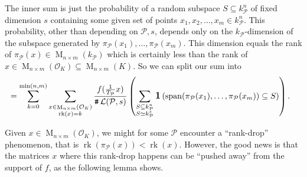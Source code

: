 \documentclass{amsart}
\newcommand{\vlad}{\color{brown}}
\theoremstyle{definition}
\theoremstyle{remark}
\DeclareMathOperator{\M}{M}
\DeclareMathOperator{\card}{\texttt{\#}}
\DeclareMathOperator{\rank}{rk}
\DeclareMathOperator{\spant}{span}
\DeclareMathOperator{\ind}{\mathlarger{\mathbf{1}}}
\DeclareMathOperator{\N}{N}
\begin{document}
The inner sum is just the probability of a random subspace $S \subseteq k_\mathcal{P}^{n}$ of fixed dimension $s$ containing some given set of points $x_1,x_2,\dots,x_m \in k_\mathcal{P}^{n}$. This probability, other than depending on $\mathcal{P},s$, depends only on the $k_\mathcal{P}$-dimension of the subspace generated by $\pi_\mathcal{P}(x_1),\dots,\pi_\mathcal{P}(x_m)$. 
This dimension equals the rank of $\pi_\mathcal{P}(x) \in \M_{ n \times m }(k_\mathcal{P})$ 
which is certainly less than the rank of 
$x\in \M_{n \times m}(\mathcal{O}_K) \subseteq \M_{n \times m }(K)$. So we can split our sum into 
\begin{align}
& = 
\sum_{k=0}^{\min(n,m)}\sum_{\substack{x \in \M_{n \times m }(\mathcal{O}_K) \\ \rank(x) = k}}
\frac{  f( \tfrac{1}{T_{\mathcal{P}}} x)}{\card \mathcal{L}(\mathcal{P},s)} 
\left(
    \sum_{\substack{  S \subseteq k_\mathcal{P}^{n} \\  S \simeq k_{\mathcal{P}}^{s} } } 
    \ind\left(
        \spant
        ( \pi_{\mathcal{P}}(x_1),\dots,\pi_{\mathcal{P}}(x_m)) \subseteq S
\right) \right). 
\label{eq:not_even_the_final_form}
\end{align}

Given $x \in \M_{n \times m }(\mathcal{O}_K)$, we might for some $\mathcal{P}$ encounter a ``rank-drop'' phenomenon, that is $\rank\left(\pi_\mathcal{P}(x)\right) < \rank(x)$. However, the good news is that the matrices $x$ where this rank-drop happens can be ``pushed away'' from the support of $f$, as the following lemma shows.
\end{document}
